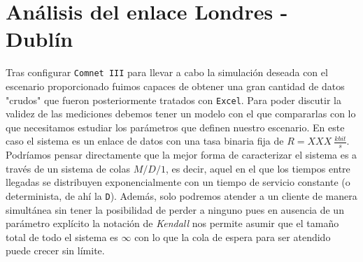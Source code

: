 \documentclass{article}[10pt]
\begin{document}
	\section{Análisis del enlace Londres - Dublín}
		Tras configurar \texttt{Comnet III} para llevar a cabo la simulación deseada con el escenario proporcionado fuimos capaces de obtener una gran cantidad de datos "crudos" que fueron posteriormente tratados con \texttt{Excel}. Para poder discutir la validez de las mediciones debemos tener un modelo con el que compararlas con lo que necesitamos estudiar los parámetros que definen nuestro escenario. En este caso el sistema es un enlace de datos con una tasa binaria fija de $R = XXX\ \frac{kbit}{s}$. Podríamos pensar directamente que la mejor forma de caracterizar el sistema es a través de un sistema de colas $M/D/1$, es decir, aquel en el que los tiempos entre llegadas se distribuyen exponencialmente con un tiempo de servicio constante (o determinista, de ahí la \texttt{D}). Además, solo podremos atender a un cliente de manera simultánea sin tener la posibilidad de perder a ninguno pues en ausencia de un parámetro explícito la notación de \textit{Kendall} nos permite asumir que el tamaño total de todo el sistema es $\infty$ con lo que la cola de espera para ser atendido puede crecer sin límite.\\
\end{document}
